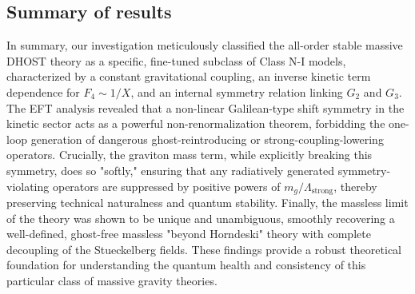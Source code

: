 \documentclass[twocolumn]{aastex631}
\begin{document}
\subsection{Summary of results}
In summary, our investigation meticulously classified the all-order stable massive DHOST theory as a specific, fine-tuned subclass of Class N-I models, characterized by a constant gravitational coupling, an inverse kinetic term dependence for $F_4 \sim 1/X$, and an internal symmetry relation linking $G_2$ and $G_3$. The EFT analysis revealed that a non-linear Galilean-type shift symmetry in the kinetic sector acts as a powerful non-renormalization theorem, forbidding the one-loop generation of dangerous ghost-reintroducing or strong-coupling-lowering operators. Crucially, the graviton mass term, while explicitly breaking this symmetry, does so "softly," ensuring that any radiatively generated symmetry-violating operators are suppressed by positive powers of $m_g/\Lambda_{\text{strong}}$, thereby preserving technical naturalness and quantum stability. Finally, the massless limit of the theory was shown to be unique and unambiguous, smoothly recovering a well-defined, ghost-free massless "beyond Horndeski" theory with complete decoupling of the Stueckelberg fields. These findings provide a robust theoretical foundation for understanding the quantum health and consistency of this particular class of massive gravity theories.
\end{document}
